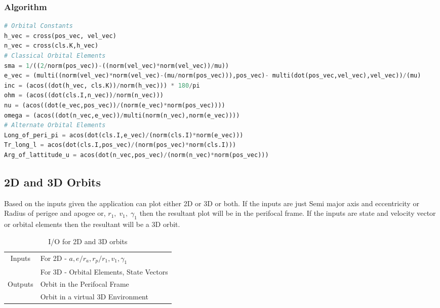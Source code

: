 \documentclass[12pt]{article}
\begin{document}
\subsubsection{Algorithm}
\begin{lstlisting}[language=python, caption=Calculation of Orbital Elements]
# Orbital Constants
h_vec = cross(pos_vec, vel_vec)
n_vec = cross(cls.K,h_vec)
# Classical Orbital Elements
sma = 1/((2/norm(pos_vec))-((norm(vel_vec)*norm(vel_vec))/mu))
e_vec = (multi((norm(vel_vec)*norm(vel_vec)-(mu/norm(pos_vec))),pos_vec)- multi(dot(pos_vec,vel_vec),vel_vec))/(mu)
inc = (acos((dot(h_vec, cls.K))/norm(h_vec))) * 180/pi
ohm = (acos((dot(cls.I,n_vec))/norm(n_vec)))
nu = (acos((dot(e_vec,pos_vec))/(norm(e_vec)*norm(pos_vec))))
omega = (acos((dot(n_vec,e_vec))/multi(norm(n_vec),norm(e_vec))))
# Alternate Orbital Elements
Long_of_peri_pi = acos(dot(cls.I,e_vec)/(norm(cls.I)*norm(e_vec)))
Tr_long_l = acos(dot(cls.I,pos_vec)/(norm(pos_vec)*norm(cls.I)))
Arg_of_lattitude_u = acos(dot(n_vec,pos_vec)/(norm(n_vec)*norm(pos_vec)))
\end{lstlisting}

\subsection{2D and 3D Orbits}

Based on the inputs given the application can plot either 2D or 3D or both. If the inputs are just Semi major axis and eccentricity or Radius of perigee and apogee or, $r_1,\;v_1,\;\gamma_1$ then the resultant plot will be in the perifocal frame. If the inputs are state and velocity vector or orbital elements then the resultant will be a 3D orbit. 
\begin{table}[H]
\centering
\begin{tabular}{@{}cl@{}}
\toprule
\multirow{2}{*}{Inputs}                      & For 2D - $a,e/r_a,r_p/ r_1, v_1, \gamma_1$ \\ \cmidrule(l){2-2} 
                                             & For 3D - Orbital Elements, State Vectors   \\ \midrule
\multicolumn{1}{r}{\multirow{2}{*}{Outputs}} & Orbit in the Perifocal Frame               \\ \cmidrule(l){2-2} 
\multicolumn{1}{r}{}                         & Orbit in a virtual 3D Environment          \\ \bottomrule
\end{tabular}
\caption{I/O for 2D and 3D orbits}
\label{o23}
\end{table}
\end{document}

